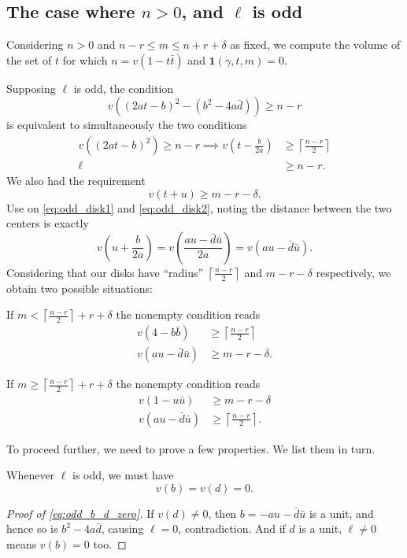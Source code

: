 \subsection{The case where $n > 0$, and $\ell$ is odd}
Considering $n > 0$ and $n-r \le m \le n+r+\delta$ as fixed,
we compute the volume of the set of $t$
for which $n = v(1-t\bar t)$ and $\mathbf{1}(\gamma,t,m) = 0$.

Supposing $\ell$ is odd, the condition
\[ v\left( (2at-b)^2 - (b^2-4a\bar d) \right) \geq n-r \]
is equivalent to simultaneously the two conditions
\begin{align}
  v\left( (2at-b)^2 \right) \geq n-r
  \implies v\left( t-\frac{b}{2a} \right) &\geq \left\lceil \frac{n-r}{2} \right\rceil
  \label{eq:odd_disk1} \\
  \ell &\ge n-r. \label{eq:odd_n_bound}
\end{align}
We also had the requirement
\begin{equation}
  v(t+u) \ge m-r-\delta.
  \label{eq:odd_disk2}
\end{equation}
Use  on \eqref{eq:odd_disk1} and \eqref{eq:odd_disk2},
noting the distance between the two centers is exactly
\[ v\left( u + \frac{b}{2a} \right) = v\left( \frac{au-\bar d \bar u}{2a} \right)
  = v(au - \bar d \bar u). \]
Considering that our disks have ``radius''
$\left\lceil \frac{n-r}{2} \right\rceil$ and $m-r-\delta$ respectively,
we obtain two possible situations:
\begin{itemize}
  \ii If $m < \left\lceil \frac{n-r}{2} \right\rceil + r + \delta$
  the nonempty condition reads
  \begin{align}
    v(4-b\bar b) &\ge \left\lceil \frac{n-r}{2} \right\rceil \label{eq:odd_ineq1} \\
    v(au - \bar d \bar u) &\ge m - r - \delta \label{eq:odd_ineq2}.
  \end{align}

  \ii If $m \geq \left\lceil \frac{n-r}{2} \right\rceil + r + \delta$
  the nonempty condition reads
  \begin{align}
    v(1-u \bar u) &\ge m-r-\delta \label{eq:odd_ineq3} \\
    v(au - \bar d \bar u) &\ge \left\lceil \frac{n-r}{2} \right\rceil \label{eq:odd_ineq4}.
  \end{align}
\end{itemize}
To proceed further, we need to prove a few properties.
We list them in turn.

\begin{fact}
  Whenever $\ell$ is odd, we must have
  \begin{equation}
    v(b) = v(d) = 0.
    \label{eq:odd_b_d_zero}
  \end{equation}
\end{fact}
\begin{proof}
  [Proof of \eqref{eq:odd_b_d_zero}]
  If $v(d) \neq 0$, then $b = -au-\bar d\bar u$ is a unit,
  and hence so is $b^2 - 4 a \bar d$, causing $\ell = 0$, contradiction.
  And if $d$ is a unit, $\ell \neq 0$ means $v(b) = 0$ too.
\end{proof}

